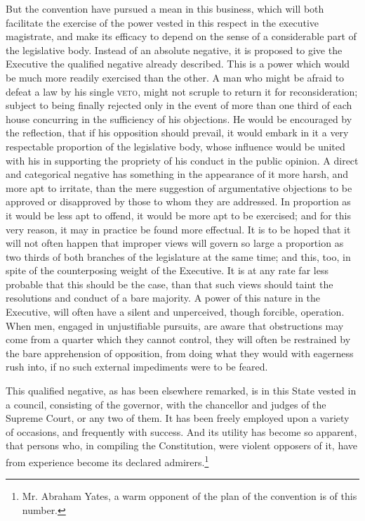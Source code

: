 But the convention have pursued a mean in this business, which will both facilitate the exercise of the power vested in this respect in the executive magistrate, and make its efficacy to depend on the sense of a considerable part of the legislative body. Instead of an absolute negative, it is proposed to give the Executive the qualified negative already described. This is a power which would be much more readily exercised than the other. A man who might be afraid to defeat a law by his single \textsc{veto}, might not scruple to return it for reconsideration; subject to being finally rejected only in the event of more than one third of each house concurring in the sufficiency of his objections. He would be encouraged by the reflection, that if his opposition should prevail, it would embark in it a very respectable proportion of the legislative body, whose influence would be united with his in supporting the propriety of his conduct in the public opinion. A direct and categorical negative has something in the appearance of it more harsh, and more apt to irritate, than the mere suggestion of argumentative objections to be approved or disapproved by those to whom they are addressed. In proportion as it would be less apt to offend, it would be more apt to be exercised; and for this very reason, it may in practice be found more effectual. It is to be hoped that it will not often happen that improper views will govern so large a proportion as two thirds of both branches of the legislature at the same time; and this, too, in spite of the counterposing weight of the Executive. It is at any rate far less probable that this should be the case, than that such views should taint the resolutions and conduct of a bare majority. A power of this nature in the Executive, will often have a silent and unperceived, though forcible, operation. When men, engaged in unjustifiable pursuits, are aware that obstructions may come from a quarter which they cannot control, they will often be restrained by the bare apprehension of opposition, from doing what they would with eagerness rush into, if no such external impediments were to be feared.

This qualified negative, as has been elsewhere remarked, is in this State vested in a council, consisting of the governor, with the chancellor and judges of the Supreme Court, or any two of them. It has been freely employed upon a variety of occasions, and frequently with success. And its utility has become so apparent, that persons who, in compiling the Constitution, were violent opposers of it, have from experience become its declared admirers.\footnote{Mr. Abraham Yates, a warm opponent of the plan of the convention is of this number.}

